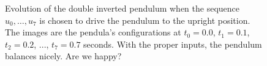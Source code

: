 \begin{figure}[htb!]
\hspace{20pt }%
\hspace{50pt}%
\hspace{20pt }%

\caption[]{Evolution of the double inverted pendulum when the sequence $u_0, \ldots, u_7$ is chosen to drive the pendulum to the upright position. The images are the pendula's configurations at $t_0=0.0$, $t_1=0.1$, $t_2=0.2$, ..., $t_7=0.7$ seconds. With the proper inputs, the pendulum balances nicely. Are we happy?}
    \label{fig:SnapShotBalancingPendulum}
\end{figure}

